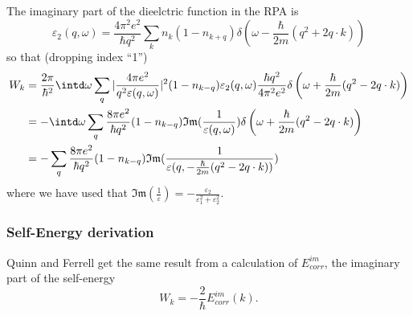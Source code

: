 \documentclass[physics,phd,nolot,nolof]{uccthesis}%
\begin{document}
{The imaginary part of the dieelctric function in the RPA is\cite{pineselementary}
\begin{equation}
  \varepsilon_2(q,\omega) = \frac{4\pi^2 e^2}{\hbar q^2} \sum_{k} n_{k} (1-n_{k+q})
\delta\left(
 \omega -\frac{\hbar}{2 m}(q^2 + 2q\cdot k)
 \right)
  \label{eq:im_eps_rpa}
\end{equation}
so that (dropping index ``1'')
\begin{equation}
  \begin{split}
  W_{k} 
&= \frac{2\pi}{\hbar^2} 
 \intd\omega\sum_{q}
  |\frac{4\pi e^2}{ q^2 \varepsilon(q,\omega)}|^2
  (1-n_{k-q})
  \varepsilon_2(q,\omega) 
  \frac{\hbar q^2}{4\pi^2 e^2}
 \delta\left(
 \omega +\frac{\hbar}{2 m}(q^2 - 2q\cdot k)
 \right)
  \\
  & =-\intd\omega\sum_{q} \frac{8\pi e^2}{\hbar q^2}
  (1-n_{k-q})
  \mathfrak{Im}(\frac{1}{\varepsilon(q,\omega)})
 \delta\left(
 \omega +\frac{\hbar}{2 m}(q^2 - 2q\cdot k)
 \right)\\
 &= - \sum_{q}
     \frac{8\pi e^2}{\hbar q^2}
  (1-n_{k-q})
  \mathfrak{Im}(\frac{1}{\varepsilon(q,
  -\frac{\hbar}{2 m}(q^2 - 2q\cdot k)
  )})
  \end{split}
  \label{eq:Wk-iminveps}
\end{equation}
where we have used that 
$ \mathfrak{Im}(\frac{1}{\varepsilon}) = -\frac{\varepsilon_2}{\varepsilon_1^2 + \varepsilon_2^2}$.

\subsubsection{Self-Energy derivation}
Quinn and Ferrell\cite{QuinnFerrell,pineselementary} get the same result from a calculation of 
$E^{im}_{corr}$, the imaginary part of the self-energy
\begin{equation}
  W_k = -\frac{2}{\hbar}E^{im}_{corr}(k).
  \label{eq:QuinnFerrell}
\end{equation}

}
\end{document}
